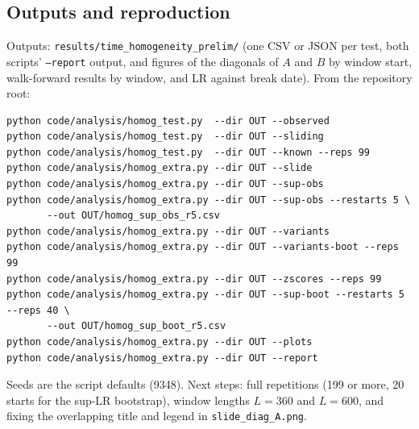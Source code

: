 \documentclass[11pt]{article}
\begin{document}
\subsection{Outputs and reproduction}
Outputs: \texttt{results/time\_homogeneity\_prelim/} (one CSV or JSON per test, both scripts' \texttt{--report} output, and figures of the diagonals of $A$ and $B$ by window start, walk-forward results by window, and LR against break date). From the repository root:
{\footnotesize
\begin{verbatim}
python code/analysis/homog_test.py  --dir OUT --observed
python code/analysis/homog_test.py  --dir OUT --sliding
python code/analysis/homog_test.py  --dir OUT --known --reps 99
python code/analysis/homog_extra.py --dir OUT --slide
python code/analysis/homog_extra.py --dir OUT --sup-obs
python code/analysis/homog_extra.py --dir OUT --sup-obs --restarts 5 \
       --out OUT/homog_sup_obs_r5.csv
python code/analysis/homog_extra.py --dir OUT --variants
python code/analysis/homog_extra.py --dir OUT --variants-boot --reps 99
python code/analysis/homog_extra.py --dir OUT --zscores --reps 99
python code/analysis/homog_extra.py --dir OUT --sup-boot --restarts 5 --reps 40 \
       --out OUT/homog_sup_boot_r5.csv
python code/analysis/homog_extra.py --dir OUT --plots
python code/analysis/homog_extra.py --dir OUT --report
\end{verbatim}
}
Seeds are the script defaults (9348). Next steps: full repetitions (199 or more, 20 starts for the sup-LR bootstrap), window lengths $L=360$ and $L=600$, and fixing the overlapping title and legend in \texttt{slide\_diag\_A.png}.

\end{document}
